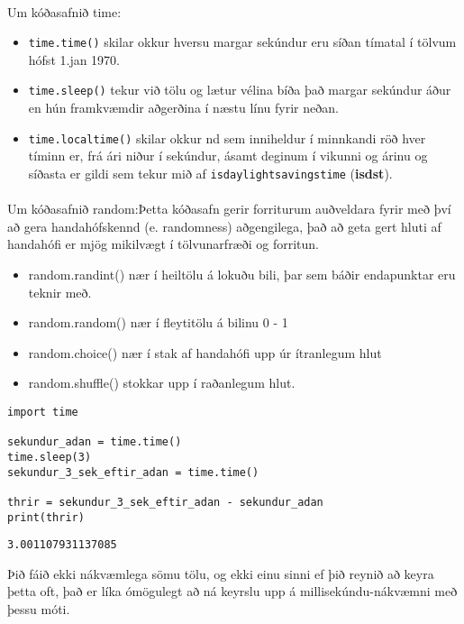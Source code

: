 \paragraph{}
Um kóðasafnið time:

\begin{itemize}
	\item \texttt{time.time()} skilar okkur hversu margar sekúndur eru síðan tímatal í tölvum hófst 1.jan 1970.
	\item \texttt{time.sleep()} tekur við tölu og lætur vélina bíða það margar sekúndur áður en hún framkvæmdir aðgerðina í næstu línu fyrir neðan.
	\item \texttt{time.localtime()} skilar okkur nd sem inniheldur í minnkandi röð hver tíminn er, frá ári niður í sekúndur, ásamt deginum í vikunni og árinu og síðasta er gildi sem tekur mið af \texttt{isdaylightsavingstime} (\textbf{isdst}).
\end{itemize}

\paragraph{}
Um kóðasafnið random:Þetta kóðasafn gerir forriturum auðveldara fyrir með því að gera handahófskennd (e. randomness) aðgengilega, það að geta gert hluti af handahófi er mjög mikilvægt í tölvunarfræði og forritun.

\begin{itemize}
	\item random.randint() nær í heiltölu á lokuðu bili, þar sem báðir endapunktar eru teknir með.
	\item random.random() nær í fleytitölu á bilinu 0 - 1
	\item random.choice() nær í stak af handahófi upp úr ítranlegum hlut
	\item random.shuffle() stokkar upp í raðanlegum hlut.
\end{itemize}
\vspace{1cm}
\begin{lstlisting}[caption=Notkun kóðasafna með time, label=lst:kóðasöfn-kynnt-time]
import time

sekundur_adan = time.time()
time.sleep(3)
sekundur_3_sek_eftir_adan = time.time()

thrir = sekundur_3_sek_eftir_adan - sekundur_adan
print(thrir)
\end{lstlisting}
\lstset{style=uttak}
\begin{lstlisting}
3.001107931137085
\end{lstlisting}
\lstset{style=venjulegt}
\vspace{1cm}
Þið fáið ekki nákvæmlega sömu tölu, og ekki einu sinni ef þið reynið að keyra þetta oft, það er líka ómögulegt að ná keyrslu upp á millisekúndu-nákvæmni með þessu móti.

